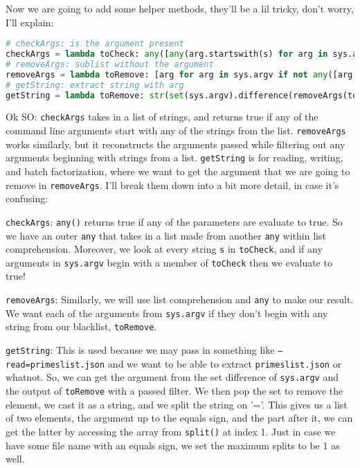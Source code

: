 \documentclass[12pt, twoside, reqno]{book}
\begin{document}
Now we are going to add some helper methods, they'll be a lil tricky, don't worry, I'll explain:
\begin{lstlisting}[language=Python]
# checkArgs: is the argument present
checkArgs = lambda toCheck: any([any(arg.startswith(s) for arg in sys.argv) for s in toCheck])
# removeArgs: sublist without the argument
removeArgs = lambda toRemove: [arg for arg in sys.argv if not any([arg.startswith(s) for s in toRemove])]
# getString: extract string with arg
getString = lambda toRemove: str(set(sys.argv).difference(removeArgs(toRemove)).pop()).split('=', 1)[1]
\end{lstlisting}

Ok SO: \texttt{checkArgs} takes in a list of strings, and returns true if any of the command line arguments start with any of the strings from the list. \texttt{removeArgs} works similarly, but it reconstructs the arguments passed while filtering out any arguments beginning with strings from a list. \texttt{getString} is for reading, writing, and batch factorization, where we want to get the argument that we are going to remove in \texttt{removeArgs}. I'll break them down into a bit more detail, in case it's confusing:

\texttt{checkArgs}: \texttt{any()} returns true if any of the parameters are evaluate to true. So we have an outer \texttt{any} that takes in a list made from another \texttt{any} within list comprehension. Moreover, we look at every string \texttt{s} in \texttt{toCheck}, and if any arguments in \texttt{sys.argv} begin with a member of \texttt{toCheck} then we evaluate to true!

\texttt{removeArgs}: Similarly, we will use list comprehension and \texttt{any} to make our result. We want each of the arguments from \texttt{sys.argv} if they don't begin with any string from our blacklist, \texttt{toRemove}.

\texttt{getString}: This is used because we may pass in something like \texttt{--read=primeslist.json} and we want to be able to extract \texttt{primeslist.json} or whatnot. So, we can get the argument from the set difference of \texttt{sys.argv} and the output of \texttt{toRemove} with a passed filter. We then pop the set to remove the element, we cast it as a string, and we split the string on '='. This gives us a list of two elements, the argument up to the equals sign, and the part after it, we can get the latter by accessing the array from \texttt{split()} at index 1. Just in case we have some file name with an equals sign, we set the maximum splits to be 1 as well.
\end{document}
